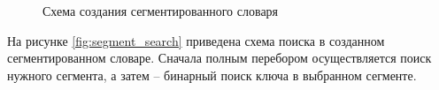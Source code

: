 \clearpage
\begin{figure}[h!]
	
	
	\caption{Схема создания сегментированного словаря}
	
	\label{fig:segmentate}
	
\end{figure}

На рисунке \ref{fig:segment_search} приведена схема поиска в созданном сегментированном словаре. Сначала полным перебором осуществляется поиск нужного сегмента, а затем -- бинарный поиск ключа в выбранном сегменте.


